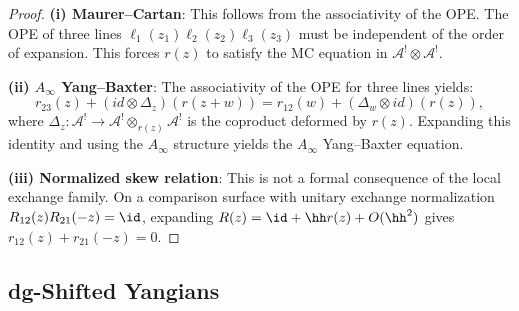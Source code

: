 \begin{proof}
\textbf{(i) Maurer--Cartan}: This follows from the associativity of the OPE. The OPE of three lines $\ell_1(z_1) \ell_2(z_2) \ell_3(z_3)$ must be independent of the order of expansion. This forces $r(z)$ to satisfy the MC equation in $\mathcal{A}^! \otimes \mathcal{A}^!$.

\textbf{(ii) $A_\infty$ Yang--Baxter}: The associativity of the OPE for three lines yields:
\begin{equation}
r_{23}(z) + (id \otimes \Delta_z)(r(z+w)) = r_{12}(w) + (\Delta_w \otimes id)(r(z)),
\end{equation}
where $\Delta_z : \mathcal{A}^! \to \mathcal{A}^! \otimes_{r(z)} \mathcal{A}^!$ is the coproduct deformed by $r(z)$. Expanding this identity and using the $A_\infty$ structure yields the $A_\infty$ Yang--Baxter equation.

\textbf{(iii) Normalized skew relation}: This is not a formal
consequence of the local exchange family.  On a comparison surface with
unitary exchange normalization \(R_{12}(z)R_{21}(-z)=\id\), expanding
\(R(z)=\id+\hh r(z)+O(\hh^2)\) gives
\(r_{12}(z)+r_{21}(-z)=0\).
\end{proof}

\subsection{dg-Shifted Yangians}

